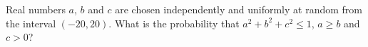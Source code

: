 Real numbers $a$, $b$ and $c$ are chosen independently and uniformly at random from the interval $(-20,20)$. What is the probability that $a^2+b^2+c^2\le1$, $a\ge b$ and $c>0$?
